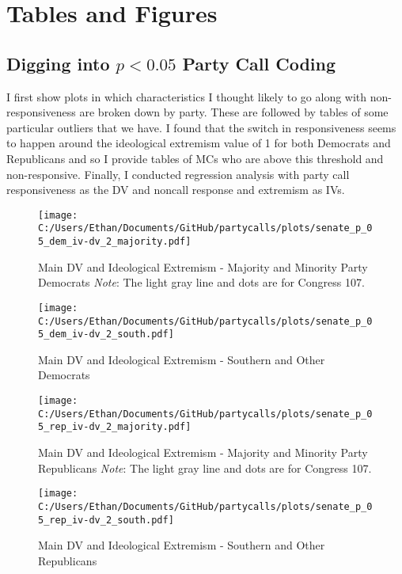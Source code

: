 \documentclass[12pt]{article}
\begin{document}
\section{Tables and Figures}

\subsection{Digging into $ p < 0.05 $ Party Call Coding}

I first show plots in which characteristics I thought likely to go along with non-responsiveness are broken down by party. These are followed by tables of some particular outliers that we have. I found that the switch in responsiveness seems to happen around the ideological extremism value of 1 for both Democrats and Republicans and so I provide tables of MCs who are above this threshold and non-responsive. Finally, I conducted regression analysis with party call responsiveness as the DV and noncall response and extremism as IVs.

\begin{figure}[h]
	\caption{Main DV and Ideological Extremism - Majority and Minority Party Democrats \textit{Note}: The light gray line and dots are for Congress 107.}
	\texttt{[image: C:/Users/Ethan/Documents/GitHub/partycalls/plots/senate\_p\_05\_dem\_iv-dv\_2\_majority.pdf]}
\end{figure}

\begin{figure}[h]
	\caption{Main DV and Ideological Extremism - Southern and Other Democrats}
	\texttt{[image: C:/Users/Ethan/Documents/GitHub/partycalls/plots/senate\_p\_05\_dem\_iv-dv\_2\_south.pdf]}
\end{figure}

\begin{figure}[h]
	\caption{Main DV and Ideological Extremism - Majority and Minority Party Republicans \textit{Note}: The light gray line and dots are for Congress 107.}
	\texttt{[image: C:/Users/Ethan/Documents/GitHub/partycalls/plots/senate\_p\_05\_rep\_iv-dv\_2\_majority.pdf]}
\end{figure}

\begin{figure}[h]
	\caption{Main DV and Ideological Extremism - Southern and Other Republicans}
	\texttt{[image: C:/Users/Ethan/Documents/GitHub/partycalls/plots/senate\_p\_05\_rep\_iv-dv\_2\_south.pdf]}
\end{figure}
\end{document}
